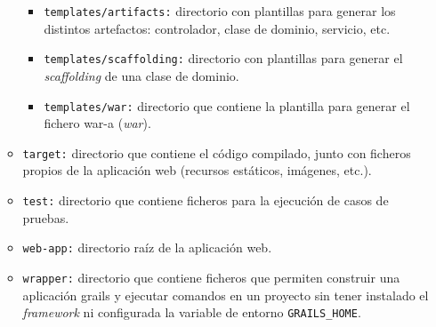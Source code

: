 \documentclass[12pt,a4paper, twoside]{report}
\begin{document}
\begin{itemize}
\begin{itemize}
			\begin{itemize}
				\item \texttt{templates/artifacts:} directorio con plantillas para generar los distintos artefactos: controlador, clase de dominio, servicio, etc.
				\item \texttt{templates/scaffolding:} directorio con plantillas para generar el \textit{\gls{scaffolding}} de una clase de dominio.
				\item \texttt{templates/war:} directorio que contiene la plantilla para generar el fichero \gls{war-a} (\textit{\gls{war}}).
			\end{itemize}
				
			\item \texttt{target:} directorio que contiene el código compilado, junto con ficheros propios de la aplicación web (recursos estáticos, imágenes, etc.).
			\item \texttt{test:} directorio que contiene ficheros para la ejecución de casos de pruebas.
			\item \texttt{web-app:} directorio raíz de la aplicación web. 
			\item \texttt{wrapper:} directorio que contiene ficheros que permiten construir una aplicación \gls{grails} y ejecutar comandos en un proyecto sin tener instalado el \textit{framework} ni configurada la variable de entorno \texttt{GRAILS\_HOME}.
		\end{itemize}
		

\end{itemize}
\end{document}
